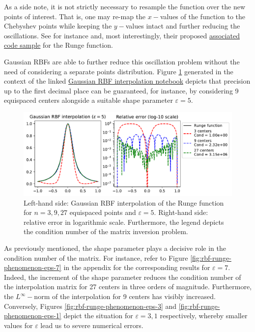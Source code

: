 \documentclass[12pt]{report} %
\begin{document}
As a side note, 
it is not strictly necessary to resample the function over the new points of interest. That is, one may re-map the $x-$values of the function to the Chebyshev points while keeping the $y-$values intact and further reducing the oscillations. See for instance \cite{DEMARCHI2021125628} and, most interestingly, their proposed \href{https://github.com/pog87/FakeNodes/blob/master/Runge.ipynb}{associated code sample} for the Runge function.

Gaussian RBFs are able to further reduce this oscillation problem without the need of considering a separate points distribution. Figure \ref{fig:rbf-runge-phenomenon-eps-5-discussion} generated in the context of the linked \href{https://github.com/heqro/tfm-experiments/blob/main/introductory_notebooks/rbf_interpolation/runge_rbf.ipynb}{Gaussian RBF interpolation notebook} depicts that precision up to the first decimal place can be guaranteed, for instance, by considering 9 equispaced centers alongside a suitable shape parameter $\varepsilon=5$.

\begin{figure}[ht]
    \centering
    \includegraphics[width=\textwidth]{imagenes/rbf_interpolation/rbf_runge_5.pdf}
    \caption{Left-hand side: Gaussian RBF interpolation of the Runge function for $n=3,9,27$ equispaced points and $\varepsilon=5$. Right-hand side: relative error in logarithmic scale. Furthermore, the legend depicts the condition number of the matrix inversion problem.}
    \label{fig:rbf-runge-phenomenon-eps-5-discussion}
\end{figure}

As previously mentioned, the shape parameter plays a decisive role in the condition number of the matrix. For instance, refer to Figure \ref{fig:rbf-runge-phenomenon-eps-7} in the appendix for the corresponding results for $\varepsilon=7$. Indeed, the increment of the shape parameter reduces the condition number of the interpolation matrix for 27 centers in three orders of magnitude. Furthermore, the $L^\infty-$norm of the interpolation for 9 centers has visibly increased. Conversely, Figures \ref{fig:rbf-runge-phenomenon-eps-3} and \ref{fig:rbf-runge-phenomenon-eps-1} depict the situation for $\varepsilon=3,1$ respectively, whereby smaller values for $\varepsilon$ lead us to severe numerical errors.
\end{document}
